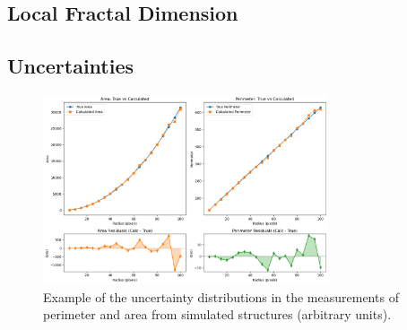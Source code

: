 \subsection{Local Fractal Dimension}

\subsection{Uncertainties}

\begin{figure}[t]
    \centering
    \includegraphics[width=0.75\textwidth]{figures/perimeter_area_uncertainties.png}
    \caption{Example of the uncertainty distributions in the measurements of perimeter and area from simulated structures (arbitrary units).}
    \label{fig:uncertainties}
\end{figure}
